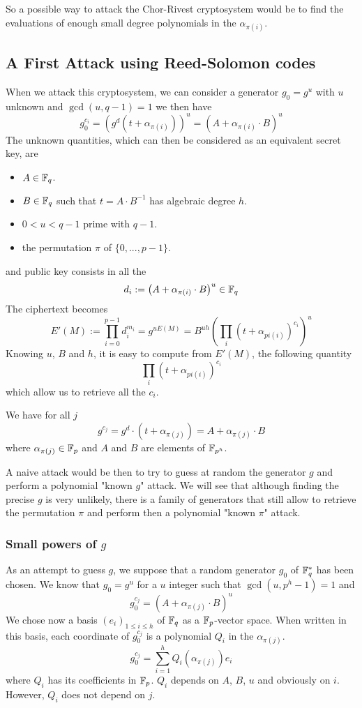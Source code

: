 \documentclass[a4paper]{article}
\newcommand{\GF}[1]{\F_{#1}}
\begin{document}
So a possible way to attack the Chor-Rivest cryptosystem would be to find the evaluations of enough small degree polynomials in the $\alpha_{\pi(i)}$.


\newpage
\subsection{A First Attack using Reed-Solomon codes}


When we attack this cryptosystem, we can consider a generator $g_0 = g^u$ with $u$ unknown and $\gcd(u, q-1) = 1$ we then have
$$ g_0^{c_i} = \left( g^d \left( t + \alpha_{\pi(i)} \right) \right)^u = \left(A + \alpha_{\pi(i)} \cdot B\right)^u$$
The unknown quantities, which can then be considered as an equivalent secret key, are
\begin{itemize}
\item $A \in \mathbb{F}_q$.
\item $B \in \mathbb{F}_q$ such that $t = A\cdot B^{-1}$ has algebraic degree $h$.
\item $0 < u < q-1$ prime with $q-1$.
\item the permutation $\pi$ of $\{ 0, ... , p-1 \}$.
\end{itemize}
and public key consists in all the
$$ d_i := \left(A + \alpha_{\pi(i)} \cdot B\right)^u \in \mathbb{F}_q$$
The ciphertext becomes
$$ E'(M) := \prod_{i=0}^{p-1} d_i^{m_i} = g^{uE(M)} = B^{uh} \left( \prod_i \left( t + \alpha_{pi(i)}\right)^{c_i} \right)^u$$
Knowing $u$, $B$ and $h$, it is easy to compute from $E'(M)$, the following quantity
$$ \prod_i \left( t + \alpha_{pi(i)}\right)^{c_i} $$
which allow us to retrieve all the $c_i$.



We have for all $j$
$$ g^{c_j} = g^d \cdot (t + \alpha_{\pi(j)} ) = A + \alpha_{\pi(j)} \cdot B $$
where $\alpha_{\pi(j)} \in \GF{p}$ and $A$ and $B$ are elements of $\GF{p^h}$.

A naive attack would be then to try to guess at random the generator $g$ and perform a polynomial "known $g$" attack. We will see that although finding the precise $g$ is very unlikely, there is a family of generators that still allow to retrieve the permutation $\pi$ and perform then a polynomial "known $\pi$" attack.

\subsubsection{Small powers of $g$}

As an attempt to guess $g$, we suppose that a random generator $g_0$ of $\GF{q}^{*}$ has been chosen. We know that $g_0 = g^u$ for a $u$ integer such that $\gcd(u, p^h-1) = 1$ and
$$ g_0 ^{c_j} = (A + \alpha_{\pi(j)} \cdot B)^u $$
We chose now a basis $(e_i)_{1 \leq i \leq h}$ of $\GF{q}$ as a $\GF{p}$-vector space. When written in this basis, each coordinate of $g_0^{c_j}$ is a polynomial $Q_i$ in the $\alpha_{\pi(j)}$.
$$ g_0^{c_j} = \sum_{i=1}^h Q_i(\alpha_{\pi(j)}) e_i $$
where $Q_i$ has its coefficients in $\GF{p}$.
$Q_i$ depends on $A$, $B$, $u$ and obviously on $i$. However, $Q_i$ does not depend on $j$.
\end{document}
